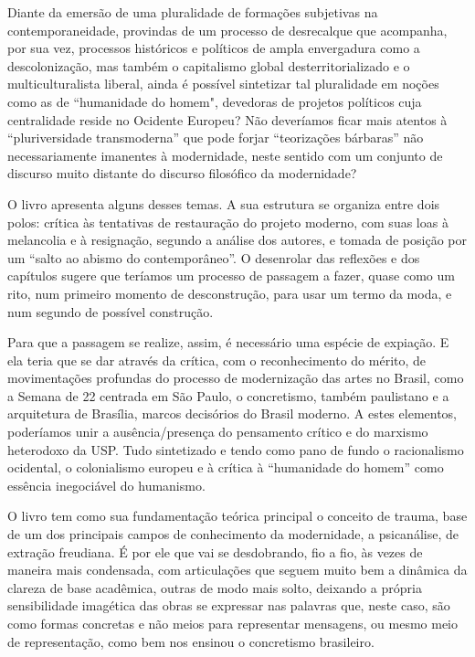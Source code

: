 \begin{multicols}{2}
Diante da emersão de uma pluralidade de formações subjetivas na
contemporaneidade, provindas de um processo de desrecalque que
acompanha, por sua vez, processos históricos e políticos de ampla
envergadura como a descolonização, mas também o capitalismo global
desterritorializado e o multiculturalista liberal, ainda é possível
sintetizar tal pluralidade em noções como as de ``humanidade do homem",
devedoras de projetos políticos cuja centralidade reside no Ocidente
Europeu? Não deveríamos ficar mais atentos à ``pluriversidade
transmoderna'' que pode forjar ``teorizações bárbaras'' não
necessariamente imanentes à modernidade, neste sentido com um conjunto
de discurso muito distante do discurso filosófico da modernidade?

O livro apresenta alguns desses temas. A sua estrutura se organiza entre
dois polos: crítica às tentativas de restauração do projeto moderno, com
suas loas à melancolia e à resignação, segundo a análise dos autores, e
tomada de posição por um ``salto ao abismo do contemporâneo''. O
desenrolar das reflexões e dos capítulos sugere que teríamos um processo
de passagem a fazer, quase como um rito, num primeiro momento de
desconstrução, para usar um termo da moda, e num segundo de possível
construção.

Para que a passagem se realize, assim, é necessário uma espécie de
expiação. E ela teria que se dar através da crítica, com o
reconhecimento do mérito, de movimentações profundas do processo de
modernização das artes no Brasil, como a Semana de 22 centrada em São
Paulo, o concretismo, também paulistano e a arquitetura de Brasília,
marcos decisórios do Brasil moderno. A estes elementos, poderíamos unir
a ausência/presença do pensamento crítico e do marxismo heterodoxo da
USP. Tudo sintetizado e tendo como pano de fundo o racionalismo
ocidental, o colonialismo europeu e à crítica à ``humanidade do homem''
como essência inegociável do humanismo.

O livro tem como sua fundamentação teórica principal o conceito de
trauma, base de um dos principais campos de conhecimento da modernidade,
a psicanálise, de extração freudiana. É por ele que vai se desdobrando,
fio a fio, às vezes de maneira mais condensada, com articulações que
seguem muito bem a dinâmica da clareza de base acadêmica, outras de modo
mais solto, deixando a própria sensibilidade imagética das obras se
expressar nas palavras que, neste caso, são como formas concretas e não
meios para representar mensagens, ou mesmo meio de representação, como
bem nos ensinou o concretismo brasileiro.


\end{multicols}
